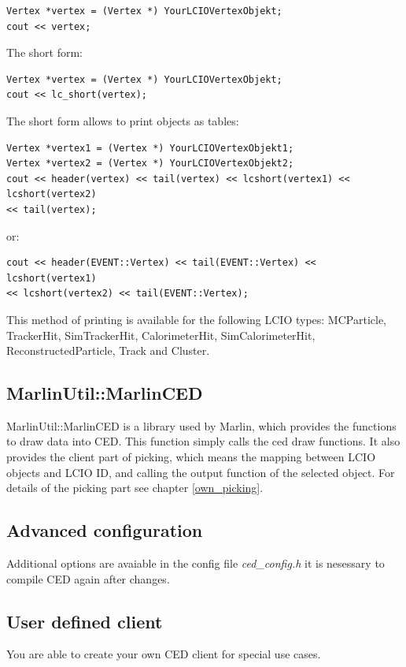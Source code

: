 \documentclass[a4paper,10pt]{article}
\begin{document}
\begin{verbatim}
Vertex *vertex = (Vertex *) YourLCIOVertexObjekt;
cout << vertex;
\end{verbatim}
The short form:
\begin{verbatim}
Vertex *vertex = (Vertex *) YourLCIOVertexObjekt;
cout << lc_short(vertex);
\end{verbatim}
The short form allows to print objects as tables:
\begin{verbatim}
Vertex *vertex1 = (Vertex *) YourLCIOVertexObjekt1;
Vertex *vertex2 = (Vertex *) YourLCIOVertexObjekt2;
cout << header(vertex) << tail(vertex) << lcshort(vertex1) << lcshort(vertex2)
<< tail(vertex);
\end{verbatim}
or:
\begin{verbatim}
cout << header(EVENT::Vertex) << tail(EVENT::Vertex) << lcshort(vertex1)
<< lcshort(vertex2) << tail(EVENT::Vertex);
\end{verbatim}
This method of printing is available for the following LCIO types: MCParticle, TrackerHit,
SimTrackerHit, CalorimeterHit, SimCalorimeterHit, ReconstructedParticle, Track and Cluster.

\subsection{MarlinUtil::MarlinCED}
MarlinUtil::MarlinCED is a library used by Marlin, which provides the functions to draw data into CED. This function simply calls the ced draw functions. It also provides the client part of picking, which means the  mapping between LCIO objects and LCIO ID, and calling the output function of the selected object. For details of the picking part see chapter \ref{own_picking}.


\subsection{Advanced configuration}
Additional options are avaiable in the config file \textit{ced\_config.h} it is nesessary to compile CED again after changes.

\subsection{User defined client}
\label{myviewer}
You are able to create your own CED client for special use cases.  
\end{document}
